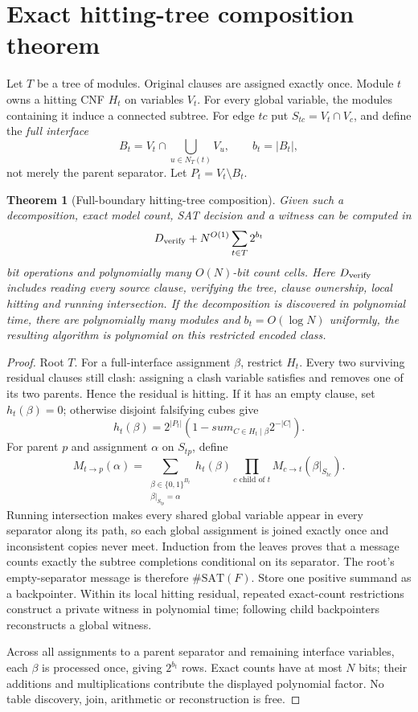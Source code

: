 \documentclass[11pt]{article}
\newtheorem{theorem}{Theorem}
\begin{document}
\section{Exact hitting-tree composition theorem}
Let $T$ be a tree of modules.  Original clauses are assigned exactly once.  Module
$t$ owns a hitting CNF $H_t$ on variables $V_t$.  For every global variable, the
modules containing it induce a connected subtree.  For edge $tc$ put
$S_{tc}=V_t\cap V_c$, and define the \emph{full interface}
\[
B_t=V_t\cap\bigcup_{u\in N_T(t)}V_u,\qquad b_t=|B_t|,
\]
not merely the parent separator.  Let $P_t=V_t\setminus B_t$.

\begin{theorem}[Full-boundary hitting-tree composition]
Given such a decomposition, exact model count, SAT decision and a witness can be
computed in
\[
D_{\rm verify}+N^{O(1)}\sum_{t\in T}2^{b_t}
\]
bit operations and polynomially many $O(N)$-bit count cells.  Here
$D_{\rm verify}$ includes reading every source clause, verifying the tree,
clause ownership, local hitting and running intersection.  If the decomposition
is discovered in polynomial time, there are polynomially many modules and
$b_t=O(\log N)$ uniformly, the resulting algorithm is polynomial on this
restricted encoded class.
\end{theorem}

\begin{proof}
Root $T$.  For a full-interface assignment $\beta$, restrict $H_t$.  Every two
surviving residual clauses still clash: assigning a clash variable satisfies and
removes one of its two parents.  Hence the residual is hitting.  If it has an
empty clause, set $h_t(\beta)=0$; otherwise disjoint falsifying cubes give
\[
h_t(\beta)=2^{|P_t|}\left(1-sum_{C\in H_t\mid\beta}2^{-|C|}\right).
\]
For parent $p$ and assignment $\alpha$ on $S_{tp}$, define
\[
M_{t\to p}(\alpha)=
\sum_{\substack{\beta\in\{0,1\}^{B_t}\\
\beta|_{S_{tp}}=\alpha}}
h_t(\beta)
\prod_{c\text{ child of }t}M_{c\to t}(\beta|_{S_{tc}}).
\]
Running intersection makes every shared global variable appear in every separator
along its path, so each global assignment is joined exactly once and inconsistent
copies never meet.  Induction from the leaves proves that a message counts exactly
the subtree completions conditional on its separator.  The root's empty-separator
message is therefore $\#\mathrm{SAT}(F)$.  Store one positive summand as a
backpointer.  Within its local hitting residual, repeated exact-count restrictions
construct a private witness in polynomial time; following child backpointers
reconstructs a global witness.

Across all assignments to a parent separator and remaining interface variables,
each $\beta$ is processed once, giving $2^{b_t}$ rows.  Exact counts have at most
$N$ bits; their additions and multiplications contribute the displayed polynomial
factor.  No table discovery, join, arithmetic or reconstruction is free.
\end{proof}
\end{document}
